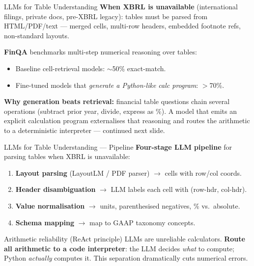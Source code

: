 \documentclass[9pt,t]{beamer}
\begin{document}
\begin{frame}{LLMs for Table Understanding}
\textbf{When XBRL is unavailable} (international filings, private docs, pre-XBRL
legacy): tables must be parsed from HTML/PDF/text --- merged cells, multi-row
headers, embedded footnote refs, non-standard layouts.

\medskip
\begin{underhood}
\textbf{FinQA} benchmarks multi-step numerical reasoning over tables:
\begin{itemize}
  \item Baseline cell-retrieval models: $\sim$50\% exact-match.
  \item Fine-tuned models that \emph{generate a Python-like calc program}: $>$70\%.
\end{itemize}
\end{underhood}

\medskip
\textbf{Why generation beats retrieval:} financial table questions chain several
operations (subtract prior year, divide, express as \%). A model that emits an
explicit calculation program externalises that reasoning and routes the arithmetic
to a deterministic interpreter --- continued next slide.
\end{frame}

\begin{frame}{LLMs for Table Understanding --- Pipeline}
\textbf{Four-stage LLM pipeline} for parsing tables when XBRL is unavailable:
\begin{enumerate}
  \item \textbf{Layout parsing} (LayoutLM / PDF parser) $\to$ cells with row/col coords.
  \item \textbf{Header disambiguation} $\to$ LLM labels each cell with (row-hdr, col-hdr).
  \item \textbf{Value normalisation} $\to$ units, parenthesised negatives, \% vs.\ absolute.
  \item \textbf{Schema mapping} $\to$ map to GAAP taxonomy concepts.
\end{enumerate}

\medskip
\begin{alertblock}{Arithmetic reliability (ReAct principle)}
LLMs are unreliable calculators. \textbf{Route all arithmetic to a code interpreter}:
the LLM decides \emph{what} to compute; Python \emph{actually} computes it. This
separation dramatically cuts numerical errors.
\end{alertblock}
\end{frame}
\end{document}
